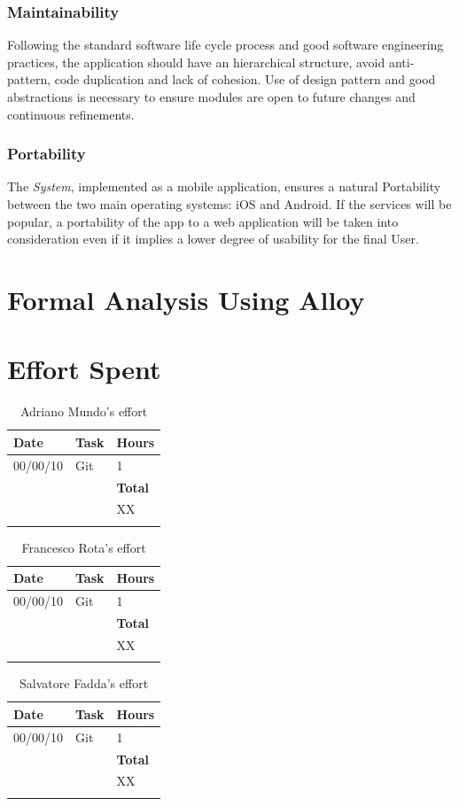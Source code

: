 \documentclass {article}
\begin{document}
	\subsubsection{Maintainability}
	Following the standard software life cycle process and good software engineering practices, the application should have an hierarchical structure, avoid anti-pattern, code duplication and lack of cohesion. Use of design pattern and good abstractions is necessary to ensure modules are open to future changes and continuous refinements. 
	\subsubsection{Portability}
	The {\it System}, implemented as a mobile application, ensures a natural Portability between the two main operating systems: iOS and Android. If the services will be popular, a portability of the app to a web application will be taken into consideration even if it implies a lower degree of usability for the final User.
	
\pagebreak


\section{Formal Analysis Using Alloy}

\section{Effort Spent}

\begin{longtable}{| p{2 cm} | p{6 cm} | p{1 cm} |} 
			\hline
			{\bf Date} & {\bf Task} & {\bf Hours}\\
			\hline
			00/00/10 & Git & 1 \\
						\hline
			& & {\bf Total} \\
			\hline
			& & XX \\
			\hline
			\caption{Adriano Mundo's effort}
\end{longtable}

\begin{longtable}{| p{2 cm} | p{6 cm} | p{1 cm} |} 
			\hline
			{\bf Date} & {\bf Task} & {\bf Hours}\\
			\hline
			00/00/10 & Git & 1 \\
						\hline
			& & {\bf Total} \\
			\hline
			& & XX \\
			\hline
			\caption{Francesco Rota's effort}
\end{longtable}

\begin{longtable}{| p{2 cm} | p{6 cm} | p{1 cm} |} 
			\hline
			{\bf Date} & {\bf Task} & {\bf Hours}\\
			\hline
			00/00/10 & Git & 1 \\
						\hline
			& & {\bf Total} \\
			\hline
			& & XX \\
			\hline
			\caption{Salvatore Fadda's effort}
\end{longtable}

\pagebreak

	
\end{document}
